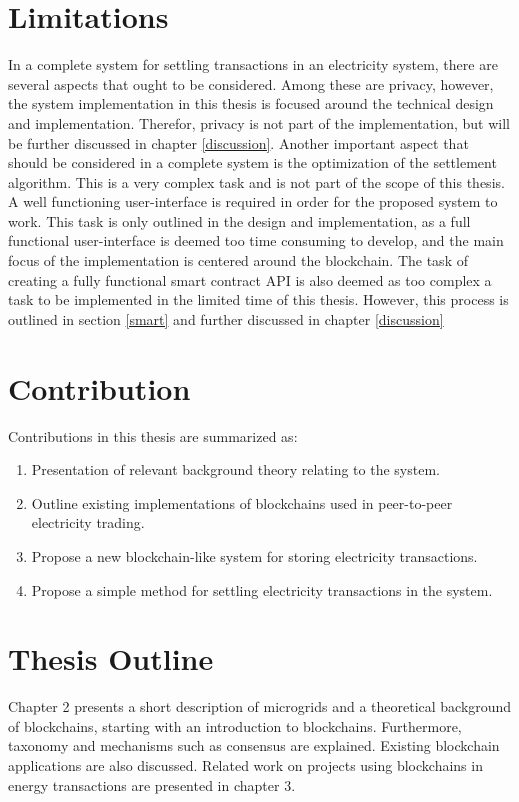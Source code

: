 \section{Limitations}
In a complete system for settling transactions in an electricity system, there are several aspects that ought to be considered. Among these are privacy, however, the system implementation in this thesis is focused around the technical design and implementation. Therefor, privacy is not part of the implementation, but will be further discussed in chapter \ref{discussion}. Another important aspect that should be considered in a complete system is the optimization of the settlement algorithm. This is a very complex task and is not part of the scope of this thesis. A well functioning user-interface is required in order for the proposed system to work. This task is only outlined in the design and implementation, as a full functional user-interface is deemed too time consuming to develop, and the main focus of the implementation is centered around the blockchain. The task of creating a fully functional smart contract API is also deemed as too complex a task to be implemented in the limited time of this thesis. However, this process is outlined in section \ref{smart} and further discussed in chapter \ref{discussion}


\section{Contribution}
Contributions in this thesis are summarized as:
\begin{enumerate}
\item Presentation of relevant background theory relating to the system.
\item Outline existing implementations of blockchains used in peer-to-peer electricity trading.
\item Propose a new blockchain-like system for storing electricity transactions.
\item Propose a simple method for settling electricity transactions in the system.
\end{enumerate}

\section{Thesis Outline}
Chapter 2 presents a short description of microgrids and a theoretical background of blockchains, starting with an introduction to blockchains. Furthermore, taxonomy and mechanisms such as consensus are explained. Existing blockchain applications are also discussed. Related work on projects using blockchains in energy transactions are presented in chapter 3. 

